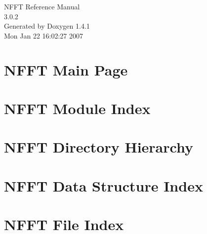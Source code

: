 \documentclass[a4paper]{book}
\begin{document}
\begin{titlepage}
\vspace*{7cm}
\begin{center}
{\Large NFFT Reference Manual\\[1ex]\large 3.0.2 }\\
\vspace*{1cm}
{\large Generated by Doxygen 1.4.1}\\
\vspace*{0.5cm}
{\small Mon Jan 22 16:02:27 2007}\\
\end{center}
\end{titlepage}
\clearemptydoublepage
{}
\tableofcontents
\clearemptydoublepage
{}
\chapter{NFFT Main Page}
\label{index}\hypertarget{index}{}
\chapter{NFFT Module Index}

\chapter{NFFT Directory Hierarchy}

\chapter{NFFT Data Structure Index}

\chapter{NFFT File Index}

\end{document}
